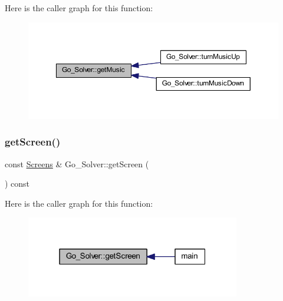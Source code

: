 Here is the caller graph for this function\+:
\nopagebreak
\begin{figure}[H]
\begin{center}
\leavevmode
\includegraphics[width=350pt]{class_go___solver_a321bc84b99b5ebdc2fbc59222aae8c74_icgraph}
\end{center}
\end{figure}
\mbox{\label{class_go___solver_a40386a16847e889ffd280d5c6b993462}} 
\subsubsection{\texorpdfstring{get\+Screen()}{getScreen()}}
{\footnotesize\ttfamily const \hyperlink{_globals_8h_a3d5776bab98402b03be09156bacf4f68}{Screens} \& Go\+\_\+\+Solver\+::get\+Screen (\begin{DoxyParamCaption}{ }\end{DoxyParamCaption}) const}

Here is the caller graph for this function\+:
\nopagebreak
\begin{figure}[H]
\begin{center}
\leavevmode
\includegraphics[width=265pt]{class_go___solver_a40386a16847e889ffd280d5c6b993462_icgraph}
\end{center}
\end{figure}
\mbox{\label{class_go___solver_aa86fa44c1be38ba004ff2f0475094cd1}} 
